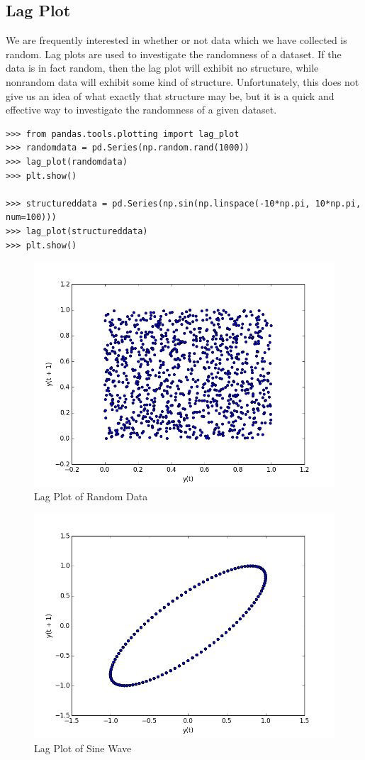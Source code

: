 \documentclass[12pt]{article}
\begin{document}
\subsection*{Lag Plot}
 We are frequently interested in whether or not data which we have collected is random. Lag plots are used to investigate the randomness of a dataset. If the data is in fact random, then the lag plot will exhibit no structure, while nonrandom data will exhibit some kind of structure. Unfortunately, this does not give us an idea of what exactly that structure may be, but it is a quick and effective way to investigate the randomness of a given dataset.
\begin{lstlisting}
>>> from pandas.tools.plotting import lag_plot
>>> randomdata = pd.Series(np.random.rand(1000))
>>> lag_plot(randomdata)
>>> plt.show()

>>> structureddata = pd.Series(np.sin(np.linspace(-10*np.pi, 10*np.pi, num=100)))
>>> lag_plot(structureddata)
>>> plt.show()
\end{lstlisting}


\begin{figure}[H]
    \centering
    \includegraphics[width=.75\textwidth]{randomdata.png}
    \caption{Lag Plot of Random Data}
\end{figure}


\begin{figure}[H]
    \centering
    \includegraphics[width=.75\textwidth]{structureddata.png}
    \caption{Lag Plot of Sine Wave}
\end{figure}
\end{document}
